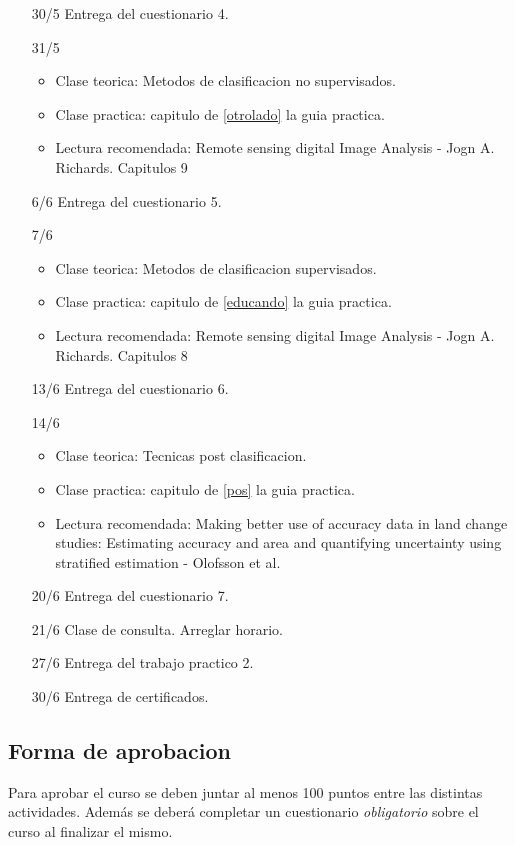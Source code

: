 \begin{itemize}
\begin{itemize}
  \end{itemize}
  \item[30/5] Entrega del cuestionario 4.
  \item[31/5] 
  \begin{itemize}
    \item Clase teorica: Metodos de clasificacion no supervisados.
    \item Clase practica: capitulo de \ref{otrolado} la guia practica.
    \item Lectura recomendada: Remote sensing digital Image Analysis - Jogn A. Richards. Capitulos 9
  \end{itemize}
  \item[6/6] Entrega del cuestionario 5.
  \item[7/6] 
  \begin{itemize}
    \item Clase teorica: Metodos de clasificacion supervisados.
    \item Clase practica: capitulo de \ref{educando} la guia practica.
    \item Lectura recomendada: Remote sensing digital Image Analysis - Jogn A. Richards. Capitulos 8
  \end{itemize}
  \item[13/6] Entrega del cuestionario 6.
  \item[14/6] 
  \begin{itemize}
    \item Clase teorica: Tecnicas post clasificacion.
    \item Clase practica: capitulo de \ref{pos} la guia practica.
    \item Lectura recomendada: Making better use of accuracy data in land change studies: Estimating accuracy and
area and quantifying uncertainty using stratified estimation - Olofsson et al.
  \end{itemize}
  \item[20/6] Entrega del cuestionario 7.
  \item[21/6] Clase de consulta. Arreglar horario.
  \item[27/6] Entrega del trabajo practico 2.
  \item[30/6] Entrega de certificados.
\end{itemize}

\subsection{Forma de aprobacion}
Para aprobar el curso se deben juntar al menos 100 puntos entre las distintas actividades.
Adem\'as se deber\'a completar un cuestionario \emph{obligatorio} sobre el curso al finalizar el mismo.

